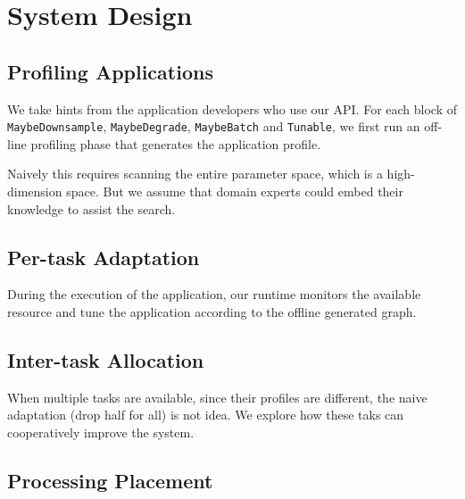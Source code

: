 \section{System Design}
\label{sec:system-design}

\subsection{Profiling Applications}
\label{sec:prof-appl}

We take hints from the application developers who use our API. For each block of
\texttt{MaybeDownsample}, \texttt{MaybeDegrade}, \texttt{MaybeBatch} and
\texttt{Tunable}, we first run an off-line profiling phase that generates the
application profile.

Naively this requires scanning the entire parameter space, which is a
high-dimension space. But we assume that domain experts could embed their
knowledge to assist the search.

\subsection{Per-task Adaptation}
\label{sec:per-task-adaptation}

During the execution of the application, our runtime monitors the available
resource and tune the application according to the offline generated graph.

\subsection{Inter-task Allocation}
\label{sec:inter-task-alloc}

When multiple tasks are available, since their profiles are different, the naive
adaptation (drop half for all) is not idea. We explore how these taks can
cooperatively improve the system.

\subsection{Processing Placement}
\label{sec:processing-placement}

